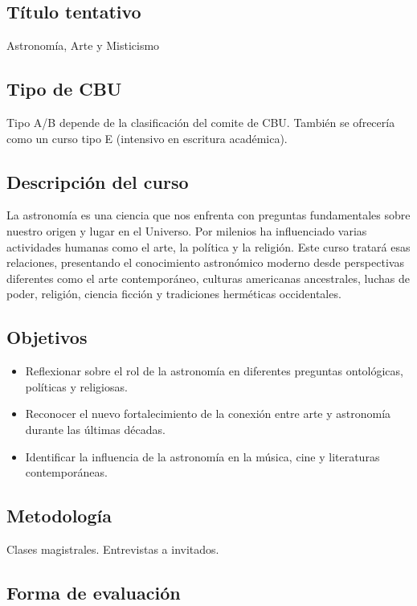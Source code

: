 \documentclass{report}
\begin{document}
\subsection*{\bf T\'itulo tentativo}
Astronom\'ia, Arte y Misticismo\\

\subsection*{Tipo de CBU}
Tipo A/B depende de la clasificaci\'on del comite de CBU. Tambi\'en se
ofrecer\'ia como un curso tipo E (intensivo en escritura acad\'emica). 


\subsection*{Descripci\'on del curso}
La astronom\'ia es una ciencia que nos enfrenta con preguntas
fundamentales sobre nuestro origen y lugar en el Universo. Por
milenios ha influenciado varias actividades humanas como el arte, la
pol\'itica y la religi\'on. Este curso tratar\'a esas relaciones,
presentando el conocimiento astron\'omico moderno desde perspectivas
diferentes como el arte contempor\'aneo, culturas americanas
ancestrales, luchas de poder, religi\'on, ciencia ficci\'on y
tradiciones herm\'eticas occidentales.   
\subsection*{Objetivos}

\begin{itemize}
\item Reflexionar sobre el rol de la astronom\'ia en diferentes
  preguntas ontol\'ogicas, pol\'iticas y religiosas. 
\item Reconocer el nuevo fortalecimiento de la conexi\'on entre arte y
  astronom\'ia durante las \'ultimas d\'ecadas.
\item Identificar la influencia de la astronom\'ia en la m\'usica,
  cine y literaturas contempor\'aneas.
\end{itemize}

\subsection*{Metodolog\'ia}

Clases magistrales. Entrevistas a invitados.

\subsection*{Forma de evaluaci\'on}
\end{document}
